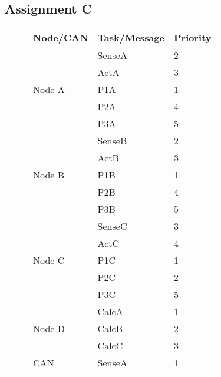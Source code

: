     \subsection{Assignment C}
    \renewcommand{\arraystretch}{1.4}
    \begin{figure}[H]
    \centering
    \begin{minipage}{0.5\textwidth}
        \begin{table}[H]
        \centering
            \begin{tabular}{|l|l|l|}
            \hline
            \rowcolor{green!40}\textbf{Node/CAN} & \textbf{Task/Message} & \textbf{Priority}   \\ \hline
            \multirow{5}{*}{Node A}     & SenseA    & 2 \\
                                        & ActA      & 3 \\ 
                                        & P1A       & 1 \\
                                        & P2A       & 4 \\
                                        & P3A       & 5 \\ \hline
            \multirow{5}{*}{Node B}     & SenseB    & 2 \\
                                        & ActB      & 3 \\ 
                                        & P1B       & 1 \\
                                        & P2B       & 4 \\
                                        & P3B       & 5 \\ \hline
            \multirow{5}{*}{Node C}     & SenseC    & 3 \\
                                        & ActC      & 4 \\ 
                                        & P1C       & 1 \\
                                        & P2C       & 2 \\
                                        & P3C       & 5 \\ \hline
            \multirow{3}{*}{Node D}     & CalcA     & 1 \\
                                        & CalcB     & 2 \\ 
                                        & CalcC     & 3 \\ \hline
            \multirow{6}{*}{CAN}        & SenseA    & 1 \\

\end{tabular}
\end{table}
\end{minipage}
\end{figure}
